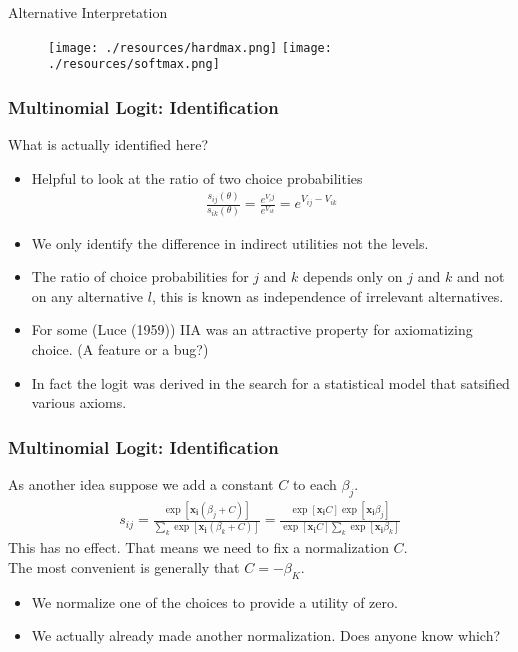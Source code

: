 \begin{frame}{Alternative Interpretation}
\begin{figure}[htbp]
\begin{center}
\texttt{[image: ./resources/hardmax.png]}
\texttt{[image: ./resources/softmax.png]}
\end{center}
\end{figure}
\end{frame}

\begin{frame}
\frametitle{Multinomial Logit: Identification}
What is actually identified here?
\begin{itemize}
\item Helpful to look at the ratio of two choice probabilities
\begin{align*}
\frac{s_{ij}(\theta)}{s_{ik}(\theta)}  = \frac{e^{V_ij}}{e^{V_{ik}}} = e^{V_{ij} - V_{ik}}
\end{align*}
\item We only identify the \alert{difference in indirect utilities} not the levels.
\item The ratio of choice probabilities for $j$ and $k$ depends only on $j$ and $k$ and not on any alternative $l$, this is known as \alert{independence of irrelevant alternatives}.
\item For some (Luce (1959)) IIA was an attractive property for axiomatizing choice. (A feature or a bug?)
\item In fact the logit was derived in the search for a statistical model that satsified various axioms.
\end{itemize}
\end{frame}

\begin{frame}
\frametitle{Multinomial Logit: Identification}
As another idea suppose we add a constant $C$ to each $\beta_j$.
\begin{eqnarray*}
s_{ij} = \frac{\exp[\mathbf{x_i} (\beta_j+C) ]}{\sum_k \exp[\mathbf{x_i} (\beta_k+C) ]} =  \frac{\exp[\mathbf{x_i} C] \exp[\mathbf{x_i} \beta_j ]}{\exp[\mathbf{x_i} C] \sum_k \exp[\mathbf{x_i} \beta_k ]}
\end{eqnarray*}
This has no effect.  That means we need to fix a normalization $C$.\\
 The most convenient is generally that $C = - \beta_K$.
\begin{itemize}
\item We normalize one of the choices to provide a utility of zero.
\item We actually already made another normalization. Does anyone know which?
\end{itemize}
\end{frame}


